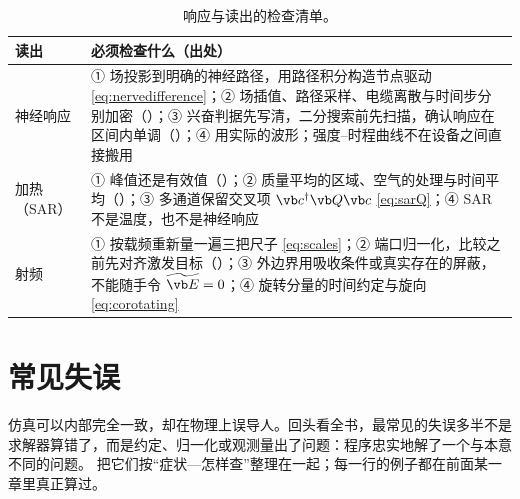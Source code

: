 \begin{table}[htbp]\centering\small
\caption{响应与读出的检查清单。}\label{tab:practice-check-responses}
\begin{tabularx}{\linewidth}{@{}>{\raggedright\arraybackslash}p{.13\linewidth} Y@{}}
\toprule
读出 & 必须检查什么（出处）\\\midrule
神经响应 & ① 场投影到明确的神经路径，用路径积分构造节点驱动 \eqref{eq:nervedifference}；② 场插值、路径采样、电缆离散与时间步分别加密（）；③ 兴奋判据先写清，二分搜索前先扫描，确认响应在区间内单调（）；④ 用实际的波形；强度--时程曲线不在设备之间直接搬用\\
加热（SAR） & ① 峰值还是有效值（）；② 质量平均的区域、空气的处理与时间平均（）；③ 多通道保留交叉项 $\vb c^\dagger\vb Q\vb c$ \eqref{eq:sarQ}；④ SAR 不是温度，也不是神经响应\\
射频 & ① 按载频重新量一遍三把尺子 \eqref{eq:scales}；② 端口归一化，比较之前先对齐激发目标（）；③ 外边界用吸收条件或真实存在的屏蔽，不能随手令 $\widetilde{\vb E}=0$；④ 旋转分量的时间约定与旋向 \eqref{eq:corotating}\\
\bottomrule
\end{tabularx}
\end{table}

\section{常见失误}\label{sec:practice-failures}

仿真可以内部完全一致，却在物理上误导人。回头看全书，最常见的失误多半不是求解器算错了，而是约定、归一化或观测量出了问题：程序忠实地解了一个与本意不同的问题。 把它们按“症状—怎样查”整理在一起；每一行的例子都在前面某一章里真正算过。

